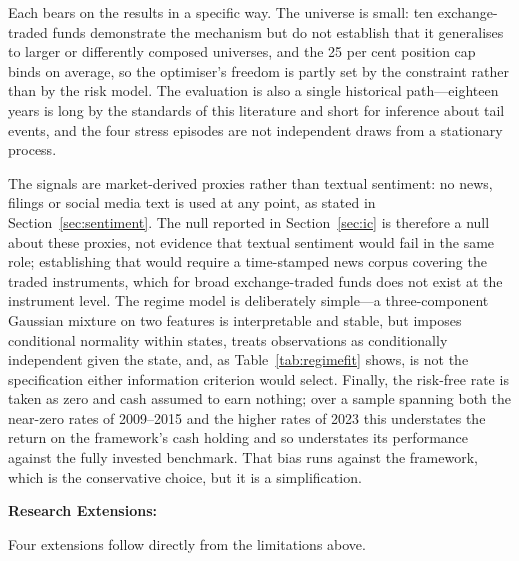 \documentclass{singlecol-new}
\theoremstyle{TH}{
\newtheorem{lemma}{Lemma}
\newtheorem{theorem}[lemma]{Theorem}
\newtheorem{corrolary}[lemma]{Corrolary}
\newtheorem{conjecture}[lemma]{Conjecture}
\newtheorem{proposition}[lemma]{Proposition}
\newtheorem{claim}[lemma]{Claim}
\newtheorem{stheorem}[lemma]{Wrong Theorem}
\newtheorem{algorithm}{Algorithm}
}
\theoremstyle{THrm}{
\newtheorem{definition}{Definition}[section]
\newtheorem{question}{Question}[section]
\newtheorem{remark}{Remark}
\newtheorem{scheme}{Scheme}
}
\theoremstyle{THhit}{
\newtheorem{case}{Case}[section]
}
\begin{document}
Each bears on the results in a specific way. The universe is small: ten exchange-traded
funds demonstrate the mechanism but do not establish that it generalises to larger or
differently composed universes, and the 25 per cent position cap binds on average, so the
optimiser's freedom is partly set by the constraint rather than by the risk model. The
evaluation is also a single historical path---eighteen years is long by the standards of
this literature and short for inference about tail events, and the four stress episodes
are not independent draws from a stationary process.

The signals are market-derived proxies rather than textual sentiment: no news, filings or
social media text is used at any point, as stated in Section~\ref{sec:sentiment}. The
null reported in Section~\ref{sec:ic} is therefore a null about these proxies, not
evidence that textual sentiment would fail in the same role; establishing that would
require a time-stamped news corpus covering the traded instruments, which for broad
exchange-traded funds does not exist at the instrument level. The regime model is
deliberately simple---a three-component Gaussian mixture on two features is interpretable
and stable, but imposes conditional normality within states, treats observations as
conditionally independent given the state, and, as Table~\ref{tab:regimefit} shows, is
not the specification either information criterion would select. Finally, the risk-free
rate is taken as zero and cash assumed to earn nothing; over a sample spanning both the
near-zero rates of 2009--2015 and the higher rates of 2023 this understates the return on
the framework's cash holding and so understates its performance against the fully
invested benchmark. That bias runs against the framework, which is the conservative
choice, but it is a simplification.

\textbf{Research Extensions:}

Four extensions follow directly from the limitations above.
\end{document}
